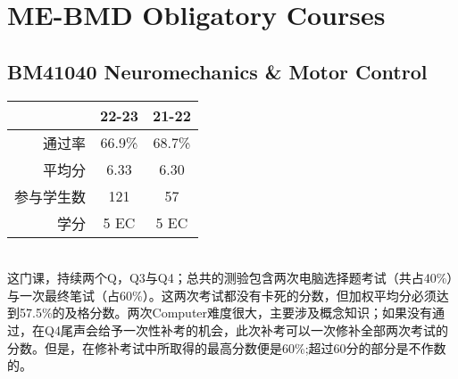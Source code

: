 \vspace{\betsubsec} %
\section{ME-BMD Obligatory Courses}
\subsection{BM41040 Neuromechanics \& Motor Control}\hypertarget{BM41040}{} 
\begin{minipage}{0.45\textwidth}
\centering
{}
\end{minipage}%
\begin{minipage}{0.45\textwidth}
\raggedleft
\begin{tabular}{r|c|c}
\textbf{} & \textbf{22-23} & \textbf{21-22} \\ \hline
通过率 & 66.9\% & 68.7\% \\ 
平均分 & 6.33 & 6.30\\ 
参与学生数 & 121 &  57\\
学分 & 5 EC & 5 EC\\

\end{tabular}
\end{minipage}\\

这门课，持续两个Q，Q3与Q4；总共的测验包含两次电脑选择题考试（共占40\%）与一次最终笔试（占60\%）。这两次考试都没有卡死的分数，但加权平均分必须达到57.5\%的及格分数。两次Computer难度很大，主要涉及概念知识；如果没有通过，在Q4尾声会给予一次性补考的机会，此次补考可以一次修补全部两次考试的分数。但是，在修补考试中所取得的最高分数便是60\%;超过60分的部分是不作数的。

